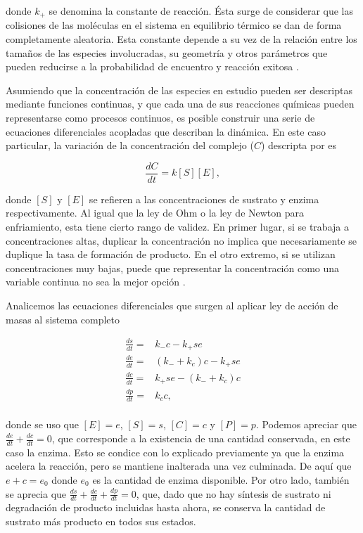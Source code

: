 \begin{center}
\end{center}

\noindent donde $k_+$ se denomina la constante de reacción. Ésta surge de considerar que las colisiones de las moléculas en el sistema en equilibrio térmico se dan de forma completamente aleatoria. Esta constante depende a su vez de la relación entre los tamaños de las especies involucradas, su geometría y otros parámetros que pueden reducirse a la probabilidad de encuentro y reacción exitosa \citep{Gillespie1977}.

Asumiendo que la concentración de las especies en estudio pueden ser descriptas mediante funciones continuas, y que cada una de sus reacciones químicas pueden representarse como procesos continuos, es posible construir una serie de ecuaciones diferenciales acopladas que describan la dinámica. En este caso particular, la variación de la concentración del complejo ($C$) descripta por \cite{Gillespie1977} es

\begin{equation}
    \frac{dC}{dt} = k[S][E],
\end{equation}

\noindent donde $[S]$ y $[E]$ se refieren a las concentraciones de sustrato y enzima respectivamente. Al igual que la ley de Ohm o la ley de Newton para enfriamiento, esta tiene cierto rango de validez. En primer lugar, si se trabaja a concentraciones altas, duplicar la concentración no implica que necesariamente se duplique la tasa de formación de producto. En el otro extremo, si se utilizan concentraciones muy bajas, puede que representar la concentración como una variable continua no sea la mejor opción \citep{Keener2009}.

Analicemos las ecuaciones diferenciales que surgen al aplicar ley de acción de masas al sistema completo

\begin{align}
    \frac{ds}{dt} =& k_- c - k_+ se \label{eq:cin_sens}\\
    \frac{de}{dt} =& (k_- + k_c) c - k_+ se\\
    \frac{dc}{dt} =& k_+ se - (k_- + k_c) c\\
    \frac{dp}{dt} =& k_c c, \label{eq:cin_prod}\\
\end{align}

\noindent donde se uso que $[E]=e$, $[S]=s$, $[C]=c$ y $[P]=p$. Podemos apreciar que $\frac{de}{dt} + \frac{dc}{dt} = 0$, que corresponde a la existencia de una cantidad conservada, en este caso la enzima. Esto se condice con lo explicado previamente ya que la enzima acelera la reacción, pero se mantiene inalterada una vez culminada. De aquí que $e+c=e_0$ donde $e_0$ es la cantidad de enzima disponible. Por otro lado, también se aprecia que $\frac{ds}{dt} + \frac{dc}{dt} + \frac{dp}{dt} = 0$, que, dado que no hay síntesis de sustrato ni degradación de producto incluidas hasta ahora, se conserva la cantidad de sustrato más producto en todos sus estados.

